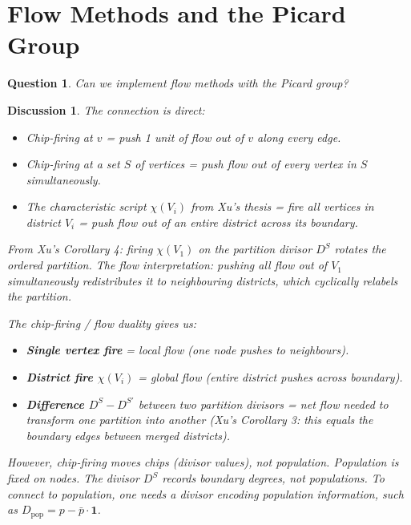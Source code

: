 \documentclass[11pt]{article}
\newtheorem{question}{Question}
\newtheorem{answer}{Discussion}
\begin{document}
\section{Flow Methods and the Picard Group}

\begin{question}
Can we implement flow methods with the Picard group?
\end{question}

\begin{answer}
The connection is direct:
\begin{itemize}
  \item Chip-firing at $v$ = push 1 unit of flow out of $v$ along every edge.
  \item Chip-firing at a set $S$ of vertices = push flow out of every vertex
    in $S$ simultaneously.
  \item The characteristic script $\chi(V_i)$ from Xu's thesis = fire all
    vertices in district $V_i$ = push flow out of an entire district across
    its boundary.
\end{itemize}

From Xu's Corollary 4: firing $\chi(V_1)$ on the partition divisor $D^S$
rotates the ordered partition. The flow interpretation: pushing all flow out
of $V_1$ simultaneously redistributes it to neighbouring districts, which
cyclically relabels the partition.

The chip-firing / flow duality gives us:
\begin{itemize}
  \item \textbf{Single vertex fire} = local flow (one node pushes to
    neighbours).
  \item \textbf{District fire $\chi(V_i)$} = global flow (entire district
    pushes across boundary).
  \item \textbf{Difference $D^S - D^{S'}$} between two partition divisors =
    net flow needed to transform one partition into another (Xu's Corollary 3:
    this equals the boundary edges between merged districts).
\end{itemize}

However, chip-firing moves chips (divisor values), not population. Population
is fixed on nodes. The divisor $D^S$ records boundary degrees, not
populations. To connect to population, one needs a divisor encoding population
information, such as $D_{\mathrm{pop}} = p - \bar{p} \cdot \mathbf{1}$.
\end{answer}
\end{document}
